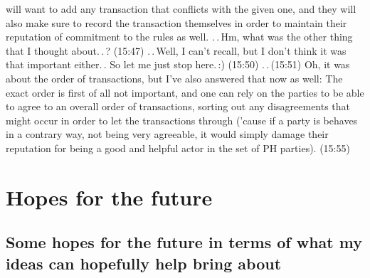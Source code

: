 \documentclass{report}
\begin{document}
will want to add any transaction that conflicts with the given one, and they will also make sure to record the transaction themselves in order to maintain their reputation of commitment to the rules as well. .\,.\,Hm, what was the other thing that I thought about.\,.\,? (15:47) .\,.\,Well, I can't recall, but I don't think it was that important either.\,. So let me just stop here.\,:) (15:50) .\,.\,(15:51) Oh, it was about the order of transactions, but I've also answered that now as well: The exact order is first of all not important, and one can rely on the parties to be able to agree to an overall order of transactions, sorting out any disagreements that might occur in order to let the transactions through ('cause if a party is behaves in a contrary way, not being very agreeable, it would simply damage their reputation for being a good and helpful actor in the set of PH parties). (15:55)






\chapter{Hopes for the future}

\section{Some hopes for the future in terms of what my ideas can hopefully help bring about}
\label{Some_hopes_in_terms_of_my_ideas}
\end{document}
